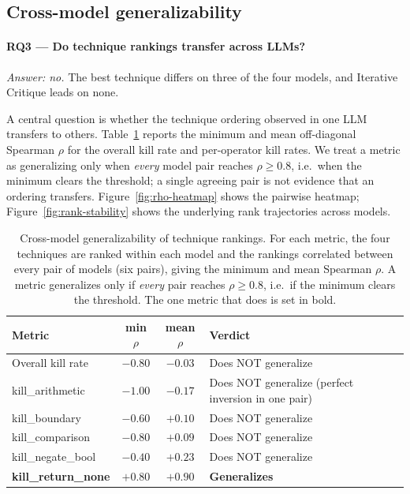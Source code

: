 \documentclass[smallextended]{svjour3}
\begin{document}
\subsection{Cross-model generalizability}

\paragraph{\textnormal{\textbf{RQ3} --- Do technique rankings transfer across LLMs?}}
\emph{Answer: no.} The best technique differs on three of the four
models, and Iterative Critique leads on none.

\label{sec:results-generalisability}

A central question is whether the technique ordering observed in one
LLM transfers to others. Table~\ref{tab:generalisability} reports
the minimum and mean off-diagonal Spearman $\rho$ for the overall
kill rate and per-operator kill rates. We treat a metric as
generalizing only when \emph{every} model pair reaches
$\rho \geq 0.8$, i.e.\ when the minimum clears the threshold; a
single agreeing pair is not evidence that an ordering transfers. Figure~\ref{fig:rho-heatmap}
shows the pairwise heatmap; Figure~\ref{fig:rank-stability} shows
the underlying rank trajectories across models.

\begin{table}[t]
\centering
\caption{Cross-model generalizability of technique rankings. For each
metric, the four techniques are ranked within each model and the
rankings correlated between every pair of models (six pairs), giving
the minimum and mean Spearman $\rho$. A metric generalizes only if
\emph{every} pair reaches $\rho \geq 0.8$, i.e.\ if the minimum
clears the threshold. The one metric that does is set in bold.}
\label{tab:generalisability}
\begin{tabular}{@{}lccl@{}}
\toprule
Metric & min $\rho$ & mean $\rho$ & Verdict \\
\midrule
Overall kill rate & $-0.80$ & $-0.03$ & Does NOT generalize \\
kill\_arithmetic & $-1.00$ & $-0.17$ & Does NOT generalize (perfect inversion in one pair) \\
kill\_boundary & $-0.60$ & $+0.10$ & Does NOT generalize \\
kill\_comparison & $-0.80$ & $+0.09$ & Does NOT generalize \\
kill\_negate\_bool & $-0.40$ & $+0.23$ & Does NOT generalize \\
\textbf{kill\_return\_none} & $\boldsymbol{+0.80}$ & $\boldsymbol{+0.90}$ & \textbf{Generalizes} \\
\bottomrule
\end{tabular}
\end{table}
\end{document}
